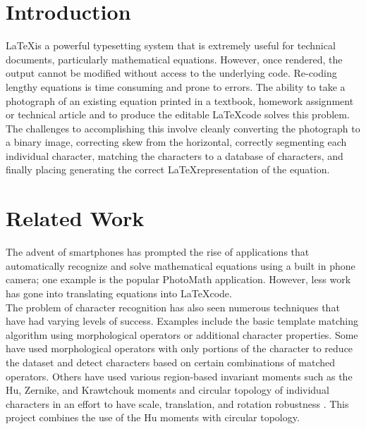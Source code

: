 \documentclass[journal]{IEEEtran}
\begin{document}
\section{Introduction}
% 
% 
% 
% 
\LaTeX is a powerful typesetting system that is extremely useful for technical documents, particularly mathematical equations. However, once rendered, the output cannot be modified without access to the underlying code. Re-coding lengthy equations is time consuming and prone to errors. The ability to take a photograph of an existing equation printed in a textbook, homework assignment or technical article and to produce the editable \LaTeX code solves this problem. The challenges to accomplishing this involve cleanly converting the photograph to a binary image, correcting skew from the horizontal, correctly segmenting each individual character, matching the characters to a database of characters, and finally placing generating the correct \LaTeX representation of the equation.

\section{Related Work}
The advent of smartphones has prompted the rise of applications that automatically recognize and solve mathematical equations using a built in phone camera; one example is the popular PhotoMath application. However, less work has gone into translating equations into \LaTeX code.\\
The problem of character recognition has also seen numerous techniques that have had varying levels of success. Examples include the basic template matching algorithm using morphological operators or additional character properties\cite{Naqvi:article_typical}. Some have used morphological operators with only portions of the character to reduce the dataset and detect characters based on certain combinations of matched operators\cite{Pradhan:article_typical}. Others have used various region-based invariant moments such as the Hu, Zernike, and Krawtchouk moments\cite{Potocnik:article_typical} and circular topology of individual characters in an effort to have scale, translation, and rotation robustness \cite{Torres-Mendez:article_typical}. This project combines the use of the Hu moments with circular topology.
\end{document}
